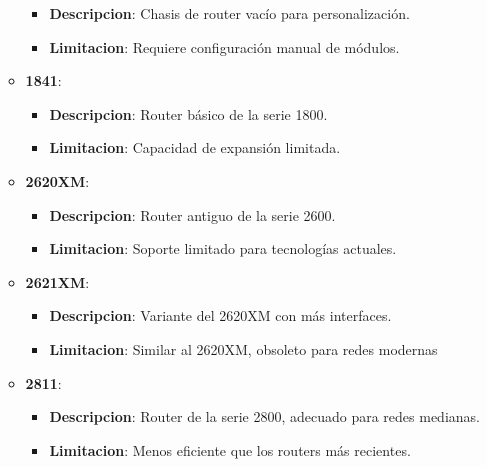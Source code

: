 \documentclass{article}
\begin{document}
\begin{enumerate}
\begin{itemize}
\begin{itemize}
                    \item \textbf{Descripcion}: Chasis de router vacío para personalización.
                    \item \textbf{Limitacion}:  Requiere configuración manual de módulos.
                \end{itemize}
                \item\textbf{1841}:
                 \begin{itemize}
                    \item \textbf{Descripcion}:  Router básico de la serie 1800.
                    \item \textbf{Limitacion}: Capacidad de expansión limitada.
                \end{itemize}
                \item\textbf{2620XM}:
                 \begin{itemize}
                    \item \textbf{Descripcion}: Router antiguo de la serie 2600.
                    \item \textbf{Limitacion}: Soporte limitado para tecnologías actuales.
                \end{itemize}
                \item\textbf{2621XM}:
                 \begin{itemize}
                    \item \textbf{Descripcion}: Variante del 2620XM con más interfaces.
                    \item \textbf{Limitacion}: Similar al 2620XM, obsoleto para redes modernas
                \end{itemize}
                \item\textbf{2811}:
                 \begin{itemize}
                    \item \textbf{Descripcion}: Router de la serie 2800, adecuado para redes medianas.
                    \item \textbf{Limitacion}: Menos eficiente que los routers más recientes.
                \end{itemize}
            \end{itemize}
            

\end{enumerate}
\end{document}
